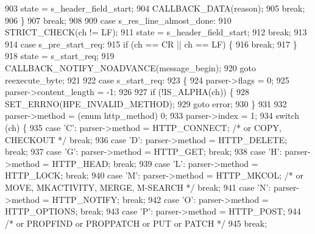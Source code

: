 \begin{DoxyCode}
903           state = s_header_field_start;
904           CALLBACK_DATA(reason);
905           \textcolor{keywordflow}{break};
906         \}
907         \textcolor{keywordflow}{break};
908 
909       \textcolor{keywordflow}{case} s_res_line_almost_done:
910         STRICT_CHECK(ch != LF);
911         state = s_header_field_start;
912         \textcolor{keywordflow}{break};
913 
914       \textcolor{keywordflow}{case} s_pre_start_req:
915         \textcolor{keywordflow}{if} (ch == CR || ch == LF) \{
916           \textcolor{keywordflow}{break};
917         \}
918         state = s_start_req;
919         CALLBACK_NOTIFY_NOADVANCE(message\_begin);
920         \textcolor{keywordflow}{goto} reexecute\_byte;
921 
922       \textcolor{keywordflow}{case} s_start_req:
923       \{
924         parser->flags = 0;
925         parser->content_length = -1;
926 
927         \textcolor{keywordflow}{if} (!IS_ALPHA(ch)) \{
928           SET_ERRNO(HPE_INVALID_METHOD);
929           \textcolor{keywordflow}{goto} error;
930         \}
931 
932         parser->method = (\textcolor{keyword}{enum} http_method) 0;
933         parser->index = 1;
934         \textcolor{keywordflow}{switch} (ch) \{
935           \textcolor{keywordflow}{case} \textcolor{charliteral}{'C'}: parser->method = HTTP_CONNECT; \textcolor{comment}{/* or COPY, CHECKOUT */} \textcolor{keywordflow}{break};
936           \textcolor{keywordflow}{case} \textcolor{charliteral}{'D'}: parser->method = HTTP_DELETE; \textcolor{keywordflow}{break};
937           \textcolor{keywordflow}{case} \textcolor{charliteral}{'G'}: parser->method = HTTP_GET; \textcolor{keywordflow}{break};
938           \textcolor{keywordflow}{case} \textcolor{charliteral}{'H'}: parser->method = HTTP_HEAD; \textcolor{keywordflow}{break};
939           \textcolor{keywordflow}{case} \textcolor{charliteral}{'L'}: parser->method = HTTP_LOCK; \textcolor{keywordflow}{break};
940           \textcolor{keywordflow}{case} \textcolor{charliteral}{'M'}: parser->method = HTTP_MKCOL; \textcolor{comment}{/* or MOVE, MKACTIVITY, MERGE, M-SEARCH */} \textcolor{keywordflow}{break};
941           \textcolor{keywordflow}{case} \textcolor{charliteral}{'N'}: parser->method = HTTP_NOTIFY; \textcolor{keywordflow}{break};
942           \textcolor{keywordflow}{case} \textcolor{charliteral}{'O'}: parser->method = HTTP_OPTIONS; \textcolor{keywordflow}{break};
943           \textcolor{keywordflow}{case} \textcolor{charliteral}{'P'}: parser->method = HTTP_POST;
944             \textcolor{comment}{/* or PROPFIND or PROPPATCH or PUT or PATCH */}
945             \textcolor{keywordflow}{break};

\end{DoxyCode}
